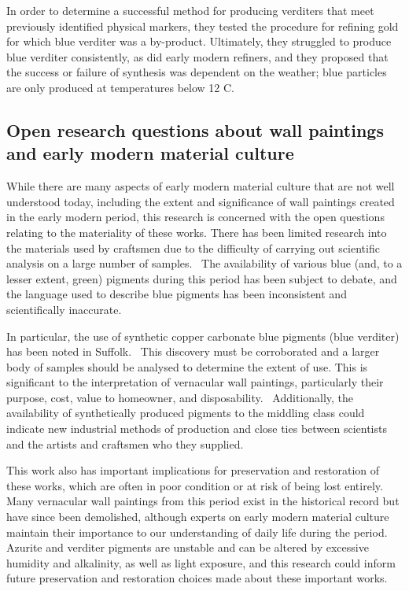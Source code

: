 In order to determine a successful method for producing verditers that meet previously identified physical markers, they tested the procedure for refining gold for which blue verditer was a by-product. Ultimately, they struggled to produce blue verditer consistently, as did early modern refiners, and they proposed that the success or failure of synthesis was dependent on the weather; blue particles are only produced at temperatures below 12 \textdegree C.~\autocite{MacTaggart}

\subsection[Open research questions about wall paintings]{Open research questions about wall paintings and early modern material culture}
\label{subsection1.1.4}

While there are many aspects of early modern material culture that are not well understood today, including the extent and significance of wall paintings created in the early modern period, this research is concerned with the open questions relating to the materiality of these works. There has been limited research into the materials used by craftsmen due to the difficulty of carrying out scientific analysis on a large number of samples.~\autocite{Baird_thesis, Davies_book} The availability of various blue (and, to a lesser extent, green) pigments during this period has been subject to debate, and the language used to describe blue pigments has been inconsistent and scientifically inaccurate.~\autocite{Harley} 

In particular, the use of synthetic copper carbonate blue pigments (blue verditer) has been noted in Suffolk.~\autocite{Baird_thesis, Kirkham_thesis} This discovery must be corroborated and a larger body of samples should be analysed to determine the extent of use. This is significant to the interpretation of vernacular wall paintings, particularly their purpose, cost, value to homeowner, and disposability.~\autocite{Baird_thesis,Davies_book} Additionally, the availability of synthetically produced pigments to the middling class could indicate new industrial methods of production and close ties between scientists and the artists and craftsmen who they supplied. 

This work also has important implications for preservation and restoration of these works, which are often in poor condition or at risk of being lost entirely. Many vernacular wall paintings from this period exist in the historical record but have since been demolished, although experts on early modern material culture maintain their importance to our understanding of daily life during the period.~\autocite{Davies_book,Hamling_book,Benton1,Benton2} Azurite and verditer pigments are unstable and can be altered by excessive humidity and alkalinity, as well as light exposure, and this research could inform future preservation and restoration choices made about these important works.~\autocite{Saunders,Cardell,Lluveras,Mattei,Dei}


